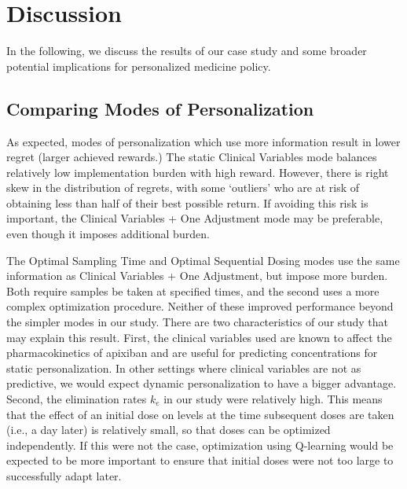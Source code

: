 \section{Discussion}\label{ss:discussion}


In the following, we discuss the results of our case study and some broader potential implications for personalized medicine policy.

\subsection{Comparing Modes of Personalization}

As expected, modes of personalization which use more information result in lower regret (larger achieved rewards.)  The static Clinical Variables mode balances relatively low implementation burden with high reward. However, there is right skew in the distribution of regrets, with some `outliers' who are at risk of obtaining less than half of their best possible return. If avoiding this risk is important, the Clinical Variables + One Adjustment mode may be preferable, even though it imposes additional burden. 

The Optimal Sampling Time and Optimal Sequential Dosing modes use the same information as Clinical Variables + One Adjustment, but impose more burden. Both require samples be taken at specified times, and the second uses a more complex optimization procedure. Neither of these improved performance beyond the simpler modes in our study. There are two characteristics of our study that may explain this result. First, the clinical variables used are known to affect the pharmacokinetics of apixiban and are useful for predicting concentrations for static personalization. In other settings where clinical variables are not as predictive, we would expect dynamic personalization to have a bigger advantage. Second, the elimination rates $k_e$ in our study were relatively high. This means that the effect of an initial dose on levels at the time subsequent doses are taken (i.e., a day later) is relatively small, so that doses can be optimized independently. If this were not the case, optimization using Q-learning would be expected to be more important to ensure that initial doses were not too large to successfully adapt later.

